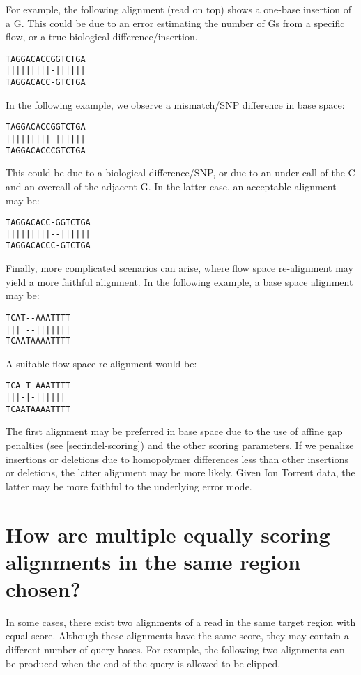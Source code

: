 \documentclass[a4paper,12pt]{book}
\begin{document}
For example, the following alignment (read on top) shows a one-base insertion of a G.
This could be due to an error estimating the number of Gs from a specific flow, or a true biological difference/insertion.
\begin{verbatim}
TAGGACACCGGTCTGA
|||||||||-||||||
TAGGACACC-GTCTGA
\end{verbatim}

In the following example, we observe a mismatch/SNP difference in base space:
\begin{verbatim}
TAGGACACCGGTCTGA
||||||||| ||||||
TAGGACACCCGTCTGA
\end{verbatim}
This could be due to a biological difference/SNP, or due to an under-call of the C and an overcall of the adjacent G.
In the latter case, an acceptable alignment may be:
\begin{verbatim}
TAGGACACC-GGTCTGA
|||||||||--||||||
TAGGACACCC-GTCTGA
\end{verbatim}

Finally, more complicated scenarios can arise, where flow space re-alignment may yield a more faithful alignment.
In the following example, a base space alignment may be:
\begin{verbatim}
TCAT--AAATTTT
||| --|||||||
TCAATAAAATTTT
\end{verbatim}
A suitable flow space re-alignment would be:
\begin{verbatim}
TCA-T-AAATTTT
|||-|-||||||
TCAATAAAATTTT
\end{verbatim}
The first alignment may be preferred in base space due to the use of affine gap penalties (see \autoref{sec:indel-scoring}) and the other scoring parameters.
If we penalize insertions or deletions due to homopolymer differences less than other insertions or deletions, the latter alignment may be more likely.
Given Ion Torrent data, the latter may be more faithful to the underlying error mode.

\section{How are multiple equally scoring alignments in the same region chosen?}

In some cases, there exist two alignments of a read in the same target region with equal score. 
Although these alignments have the same score, they may contain a different number of query bases.
For example, the following two alignments can be produced when the end of the query is allowed to be clipped. 
\end{document}
